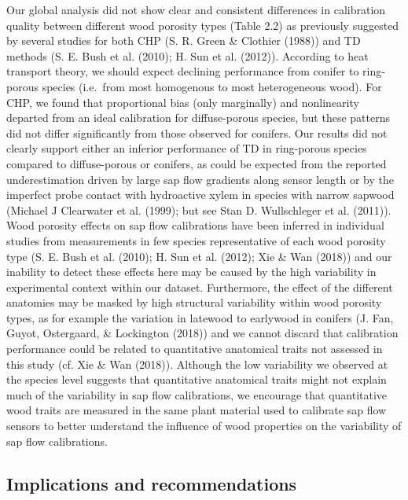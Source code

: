 \documentclass[11pt,twoside]{reedthesis}
\begin{document}
Our global analysis did not show clear and consistent differences in
calibration quality between different wood porosity types (Table 2.2) as
previously suggested by several studies for both CHP (S. R. Green \&
Clothier (1988)) and TD methods (S. E. Bush et al. (2010); H. Sun et al.
(2012)). According to heat transport theory, we should expect declining
performance from conifer to ring-porous species (i.e.~from most
homogenous to most heterogeneous wood). For CHP, we found that
proportional bias (only marginally) and nonlinearity departed from an
ideal calibration for diffuse-porous species, but these patterns did not
differ significantly from those observed for conifers. Our results did
not clearly support either an inferior performance of TD in ring-porous
species compared to diffuse-porous or conifers, as could be expected
from the reported underestimation driven by large sap flow gradients
along sensor length or by the imperfect probe contact with hydroactive
xylem in species with narrow sapwood (Michael J Clearwater et al.
(1999); but see Stan D. Wullschleger et al. (2011)). Wood porosity
effects on sap flow calibrations have been inferred in individual
studies from measurements in few species representative of each wood
porosity type (S. E. Bush et al. (2010); H. Sun et al. (2012); Xie \&
Wan (2018)) and our inability to detect these effects here may be caused
by the high variability in experimental context within our dataset.
Furthermore, the effect of the different anatomies may be masked by high
structural variability within wood porosity types, as for example the
variation in latewood to earlywood in conifers (J. Fan, Guyot,
Ostergaard, \& Lockington (2018)) and we cannot discard that calibration
performance could be related to quantitative anatomical traits not
assessed in this study (cf. Xie \& Wan (2018)). Although the low
variability we observed at the species level suggests that quantitative
anatomical traits might not explain much of the variability in sap flow
calibrations, we encourage that quantitative wood traits are measured in
the same plant material used to calibrate sap flow sensors to better
understand the influence of wood properties on the variability of sap
flow calibrations.\par

\subsection{Implications and
recommendations}\label{implications-and-recommendations}
\end{document}
